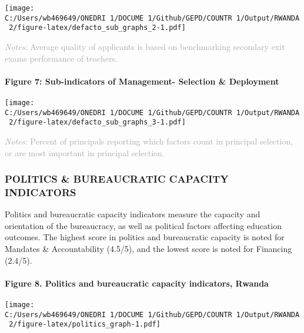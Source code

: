 \documentclass[twocolumn]{article}
\let\oldparagraph\paragraph
\renewcommand{\paragraph}[1]{\oldparagraph{#1}\mbox{}}
\begin{document}
\texttt{[image: C:/Users/wb469649/ONEDRI~1/DOCUME~1/Github/GEPD/COUNTR~1/Output/RWANDA~2/figure-latex/defacto\_sub\_graphs\_2-1.pdf]}

{\scriptsize
    \textcolor{darkgray}{\textit{Notes:} Average quality of applicants is based on benchmarking secondary exit exams performance of teachers.}
  }

\hypertarget{figure-7-sub-indicators-of-management--selection-deployment}{%
\paragraph{Figure 7: Sub-indicators of Management- Selection \&
Deployment}\label{figure-7-sub-indicators-of-management--selection-deployment}}

\texttt{[image: C:/Users/wb469649/ONEDRI~1/DOCUME~1/Github/GEPD/COUNTR~1/Output/RWANDA~2/figure-latex/defacto\_sub\_graphs\_3-1.pdf]}

{\scriptsize
    \textcolor{darkgray}{\textit{Notes:} Percent of principals reporting which factors count in principal selection, or are most important in principal selection.}
  }

\vfill\null

\hypertarget{politics-bureaucratic-capacity-indicators}{%
\subsubsection{\texorpdfstring{\textbf{POLITICS \& BUREAUCRATIC CAPACITY
INDICATORS}}{POLITICS \& BUREAUCRATIC CAPACITY INDICATORS}}\label{politics-bureaucratic-capacity-indicators}}

Politics and bureaucratic capacity indicators measure the capacity and
orientation of the bureaucracy, as well as political factors affecting
education outcomes. The highest score in politics and bureaucratic
capacity is noted for Mandates \& Accountability (4.5/5), and the lowest
score is noted for Financing (2.4/5).

\hypertarget{figure-8.-politics-and-bureaucratic-capacity-indicators-rwanda}{%
\paragraph{Figure 8. Politics and bureaucratic capacity indicators,
Rwanda}\label{figure-8.-politics-and-bureaucratic-capacity-indicators-rwanda}}

\texttt{[image: C:/Users/wb469649/ONEDRI~1/DOCUME~1/Github/GEPD/COUNTR~1/Output/RWANDA~2/figure-latex/politics\_graph-1.pdf]}
\end{document}
